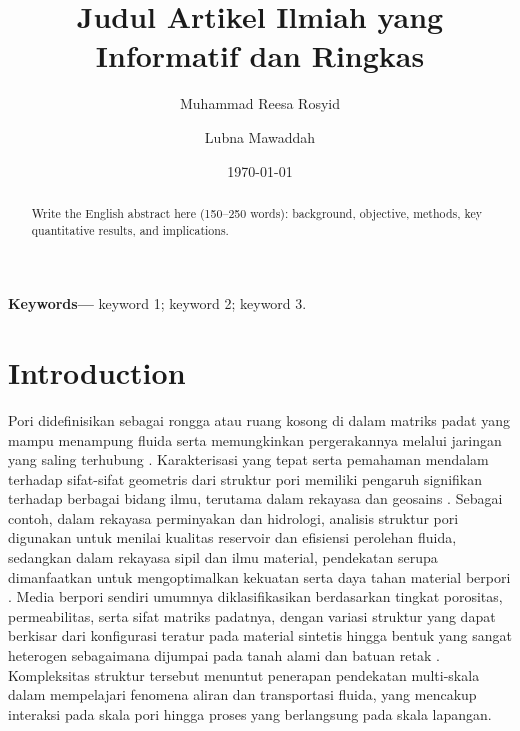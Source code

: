 \documentclass[10pt,a4paper]{article}
\title{\textbf{Judul Artikel Ilmiah yang Informatif dan Ringkas}}
\author[1]{Muhammad Reesa Rosyid}
\author[1,2]{Lubna Mawaddah}
\affil[1]{Faculty of Computer Science, Universitas Dian Nuswantoro, Semarang, Indonesia}
\affil[2]{Institusi Kedua (opsional)}
\date{\today}
\begin{document}
	\maketitle
	
	\begin{abstract}
		Write the English abstract here (150–250 words): background, objective, methods, key quantitative results, and implications.
	\end{abstract}
	\noindent\textbf{Keywords—} keyword 1; keyword 2; keyword 3.
	
	
	\section{Introduction}
	
	Pori didefinisikan sebagai rongga atau ruang kosong di dalam matriks padat yang mampu menampung fluida serta memungkinkan pergerakannya melalui jaringan yang saling terhubung \cite{yi2022, wang2022}. Karakterisasi yang tepat serta pemahaman mendalam terhadap sifat-sifat geometris dari struktur pori memiliki pengaruh signifikan terhadap berbagai bidang ilmu, terutama dalam rekayasa dan geosains \cite{lee2022}. Sebagai contoh, dalam rekayasa perminyakan dan hidrologi, analisis struktur pori digunakan untuk menilai kualitas reservoir dan efisiensi perolehan fluida, sedangkan dalam rekayasa sipil dan ilmu material, pendekatan serupa dimanfaatkan untuk mengoptimalkan kekuatan serta daya tahan material berpori \cite{chen2024, xiao2023, liu2020, hou2023, liu2022}. Media berpori sendiri umumnya diklasifikasikan berdasarkan tingkat porositas, permeabilitas, serta sifat matriks padatnya, dengan variasi struktur yang dapat berkisar dari konfigurasi teratur pada material sintetis hingga bentuk yang sangat heterogen sebagaimana dijumpai pada tanah alami dan batuan retak \cite{yang2024}. Kompleksitas struktur tersebut menuntut penerapan pendekatan multi-skala dalam mempelajari fenomena aliran dan transportasi fluida, yang mencakup interaksi pada skala pori hingga proses yang berlangsung pada skala lapangan.
	
	
	
\end{document}
